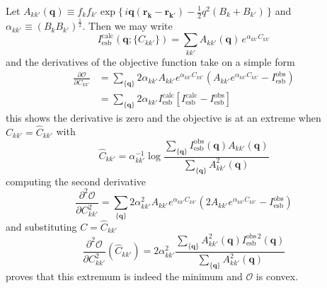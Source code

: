 \documentclass{article}
\begin{document}
Let $A_{k k'} (\mathbf{q}) \equiv f_{k}f_{k'} \exp \{ \, i \mathbf{q} (\mathbf{r_{k}}- \mathbf{r_{k'}}) - \frac{1}{2} q^2(B_k + B_{k'} ) \, \}$ and $\alpha_{k k'} \equiv (B_k B_{k'})^\frac{1}{2}$. Then we may write
\[
I_\mathrm{esb}^\mathrm{calc} (\mathbf{q}; \{ C_{kk'} \}) = \sum_{k k'} A_{k k'} (\mathbf{q}) \, e^{\alpha_{k k'} C_{k k'}}
\]
and the derivatives of the objective function take on a simple form
\begin{align*}
\frac{\partial \mathcal{O}} {\partial C_{kk'}} &= \sum_{\{\mathbf{q}\}}
2 \alpha_{k k'} A_{k k'} e^{\alpha_{k k'} C_{k k'}} 
\left( A_{k k'} e^{\alpha_{k k'} C_{k k'}} - I_\mathrm{esb}^\mathrm{obs}  \right) \\
%
&= \sum_{\{\mathbf{q}\}} 2 \alpha_{k k'} I_\mathrm{esb}^\mathrm{calc} \left[
I_\mathrm{esb}^\mathrm{calc} - I_\mathrm{esb}^\mathrm{obs}
\right]
\end{align*}
this shows the derivative is zero and the objective is at an extreme when $C_{kk'} = \hat{C}_{kk'}$ with
\[
\hat{C}_{kk'} = \alpha_{kk'}^{-1} 
\log \frac{ \sum_{\{\mathbf{q}\}} I_\mathrm{esb}^\mathrm{obs} (\mathbf{q}) A_{kk'} (\mathbf{q})}
{\sum_{\{\mathbf{q}\}} A_{kk'}^2 (\mathbf{q}) }
\]
computing the second derivative
\[
\frac{\partial^2 \mathcal{O}} {\partial C_{kk'}^2} = \sum_{\{\mathbf{q}\}}
2 \alpha_{k k'}^2 A_{k k'} e^{\alpha_{k k'} C_{k k'}} 
\left( 2 A_{k k'} e^{\alpha_{k k'} C_{k k'}} - I_\mathrm{esb}^\mathrm{obs} \right)
\]
and substituting $C = \hat{C}_{kk'}$
\[
\frac{\partial^2 \mathcal{O}} {\partial C_{kk'}^2} (\hat{C}_{kk'}) =  2 \alpha_{k k'}^2 
\frac{\sum_{\{\mathbf{q}\}} A_{kk'}^2 (\mathbf{q})I_\mathrm{esb}^{\mathrm{obs}\, 2}(\mathbf{q})}
{\sum_{\{\mathbf{q}\}} A_{kk'}^2 (\mathbf{q})}
\]
proves that this extremum is indeed the minimum and $\mathcal{O}$ is convex.
\end{document}
